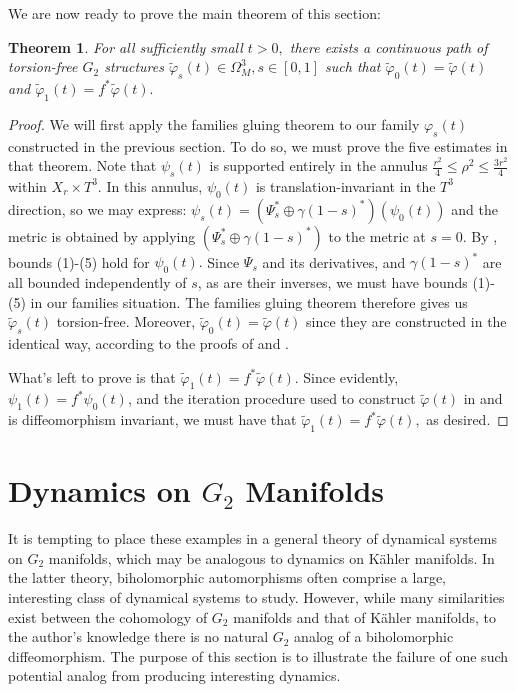 \documentclass{amsart}
\theoremstyle{theorem}
\newtheorem{theorem}{Theorem}[section]
\theoremstyle{definition}
\theoremstyle{definition}
\theoremstyle{definition}
\theoremstyle{theorem}
\theoremstyle{theorem}
\theoremstyle{theorem}
\theoremstyle{corollary}
\theoremstyle{question}
\theoremstyle{remark}
\begin{document}
We are now ready to prove the main theorem of this section:

\begin{theorem}
    For all sufficiently small $t>0,$ there exists a continuous path of torsion-free $G_2$ structures $\widetilde{\varphi}_s(t)\in\Omega^3_M, s\in[0,1]$ such that $\widetilde{\varphi}_0(t) = \widetilde{\varphi}(t)$ and $\widetilde{\varphi}_1(t) = f^*\widetilde{\varphi}(t).$
\end{theorem}

\begin{proof}
    We will first apply the families gluing theorem to our family $\varphi_s(t)$ constructed in the previous section. To do so, we must prove the five estimates in that theorem. Note that $\psi_s(t)$ is supported entirely in the annulus $\frac{r^2}4\leq\rho^2\leq\frac{3r^2}{4}$ within $X_r\times T^3.$ In this annulus, $\psi_0(t)$ is translation-invariant in the $T^3$ direction, so we may express: $\psi_s(t) = (\Psi_s^*\oplus\gamma(1-s)^*)(\psi_0(t))$ and the metric is obtained by applying $(\Psi_s^*\oplus\gamma(1-s)^*)$ to the metric at $s = 0.$ By \cite[Theorem 11.5.7]{Joycebook}, bounds (1)-(5) hold for $\psi_0(t).$ Since $\Psi_s$ and its derivatives, and $\gamma(1-s)^*$ are all bounded independently of $s$, as are their inverses, we must have bounds (1)-(5) in our families situation. The families gluing theorem therefore gives us $\widetilde{\varphi}_s(t)$ torsion-free. Moreover, $\widetilde{\varphi}_0(t) = \widetilde{\varphi}(t)$ since they are constructed in the identical way, according to the proofs of \cite[Theorem 6.2]{CGH} and \cite[Theorem 11.6.1]{Joycebook}.

    What's left to prove is that $\widetilde{\varphi}_1(t) = f^*\widetilde\varphi(t).$ Since evidently, $\psi_1(t) = f^*\psi_0(t)$, and the iteration procedure used to construct $\widetilde{\varphi}(t)$ in \cite[Theorem 11.6.1]{Joycebook} and \cite[Theorem 6.2]{CGH} is diffeomorphism invariant, we must have that $\widetilde{\varphi}_1(t) = f^*\widetilde\varphi(t),$ as desired.
\end{proof}

\section{Dynamics on $G_2$ Manifolds}

It is tempting to place these examples in a general theory of dynamical systems on $G_2$ manifolds, which may be analogous to dynamics on K\"ahler manifolds. In the latter theory, biholomorphic automorphisms often comprise a large, interesting class of dynamical systems to study. However, while many similarities exist between the cohomology of $G_2$ manifolds and that of K\"ahler manifolds, to the author's knowledge there is no natural $G_2$ analog of a biholomorphic diffeomorphism. The purpose of this section is to illustrate the failure of one such potential analog from producing interesting dynamics.
\end{document}

